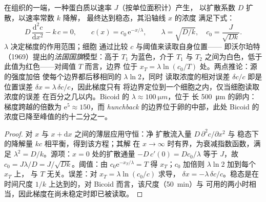 \begin{theorem}\label{thm:b3:developmental-genetics:gradient}
在组织的一端，一种蛋白质以速率 $J$（按单位面积计）产生，
以扩散系数 $D$ 扩散，以速率常数 $k$ 降解，
最终达到稳态，其沿轴线 $x$ 的浓度
满足下式：
\[
D\,\frac{\mathrm{d}^{2}c}{\mathrm{d}x^{2}} - k\,c = 0,
\qquad c(x) = c_{0}\,\mathrm{e}^{-x/\lambda}, \qquad \lambda = \sqrt{D/k},
\quad c_{0} = \frac{J}{\sqrt{Dk}} .
\]
\emph{} $\lambda$ 决定梯度的作用范围；细胞
通过比较 $c$ 与阈值来读取自身位置——
即沃尔珀特（1969）提出的\emph{法国国旗}模型：高于 $T_{1}$ 为蓝色，介于
$T_{1}$ 与 $T_{2}$ 之间为白色，低于此值为红色——对阈值 $T$ 而言，边界
位于 $x_{T} = \lambda\ln(c_{0}/T)$ 处。两点推论：源的强度加倍
使每个边界都后移相同的 $\lambda\ln 2$，同时
读取浓度的相对误差 $\delta c/c$ 即是
位置误差 $\delta x = \lambda\,\delta c/c$，因此梯度只有
将边界定位到一个细胞之内，仅当细胞读取浓度的误差
在百分之几以内。Bicoid 的 $\lambda \approx \qty{100}{\micro m}$，位于
长 \qty{500}{\micro m} 的卵内：梯度跨越的倍数为 $\mathrm{e}^{5}
\approx 150$，而 \emph{hunchback} 的边界位于卵的中部，此处
Bicoid 的浓度已降至峰值的约十二分之一。
\end{theorem}
\begin{proof}
对 $x$ 与 $x + \mathrm{d}x$ 之间的薄层应用守恒：净
扩散流入量 $D\,\partial^{2}c/\partial x^{2}$ 与
稳态下的降解量 $kc$ 相平衡，得到该方程；其解
在 $x \to \infty$ 时有界，为衰减指数函数，满足
$\lambda^{2} = D/k$。源项：$x = 0$ 处的扩散通量 $-D\,
c'(0) = Dc_{0}/\lambda$ 等于 $J$，故 $c_{0} = J\lambda/D =
J/\sqrt{Dk}$。阈值：由 $c_{0}\mathrm{e}^{-x_{T}/\lambda} = T$ 得
$x_{T}$；$c_{0}$ 加倍则 $\lambda\ln 2$ 加到每个 $x_{T}$ 上，
与 $T$ 无关。误差：对 $x_{T} = \lambda\ln(c_{0}/c)$ 求导，
$\delta x = -\lambda\,\delta c/c$。稳态是在
时间尺度 $1/k$ 上达到的，对 Bicoid 而言，该尺度（\qty{50}{min}）与
可用的两小时相当，因此梯度在尚未稳定时即已被读取。
\end{proof}

